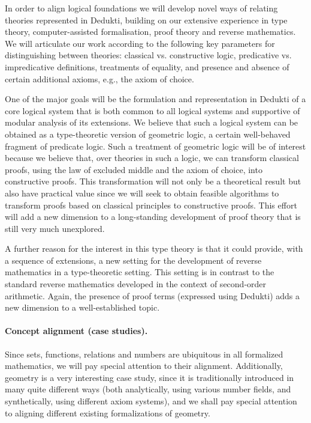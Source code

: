 In order to align logical foundations we will develop novel ways of
relating theories represented in Dedukti, building on our extensive
experience in type theory, computer-assisted formalisation, proof
theory and reverse mathematics. We will articulate our work according
to the following key parameters for distinguishing between theories:
classical vs. constructive logic, predicative vs. impredicative
definitions, treatments of equality, and presence and absence of
certain additional axioms, e.g., the axiom of choice.

One of the major goals will be the formulation and representation in
Dedukti of a core logical system that is both common to all logical
systems and supportive of modular analysis of its extensions. We
believe that such a logical system can be obtained as a type-theoretic
version of geometric logic, a certain well-behaved fragment of
predicate logic. Such a treatment of geometric logic will be of
interest because we believe that, over theories in such a logic, we
can transform classical proofs, using the law of excluded middle and
the axiom of choice, into constructive proofs.  This transformation
will not only be a theoretical result but also have practical value
since we will seek to obtain feasible algorithms to transform proofs
based on classical principles to constructive proofs.  This effort
will add a new dimension to a long-standing development of proof
theory that is still very much unexplored.

A further reason for the interest in this type theory is that it could
provide, with a sequence of extensions, a new setting for the
development of reverse mathematics in a type-theoretic setting. This
setting is in contrast to the standard reverse mathematics developed
in the context of second-order arithmetic. Again, the presence of
proof terms (expressed using Dedukti) adds a new dimension to a
well-established topic.

\paragraph*{Concept alignment (case studies).}
Since sets, functions, relations and numbers are ubiquitous in all
formalized mathematics, we will pay special attention to their
alignment. Additionally, geometry is a very interesting case study,
since it is traditionally introduced in many quite different ways
(both analytically, using various number fields, and synthetically,
using different axiom systems), and we shall pay special attention to
aligning different existing formalizations of geometry.


